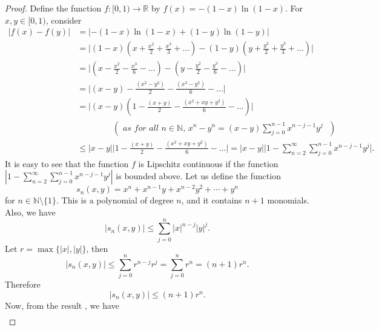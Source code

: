 \documentclass[pdflatex]{sn-jnl}%
\theoremstyle{thmstyleone}
\theoremstyle{thmstyletwo}%
\theoremstyle{thmstylethree}%
\begin{document}
\begin{proof}
    Define the function \( f : [0, 1) \to \mathbb{R} \) by $f(x) = -(1 - x)\ln(1 - x)$. For $x,y\in [0,1)$, consider
    \begin{equation}
    \begin{split}
        |f(x)-f(y)|&=|-(1 - x)\ln(1 - x)+(1 - y)\ln(1 - y)| \\
                   &=\Bigg|(1-x)\left(x+\frac{x^2}{2}+\frac{x^3}{3}+... \right)-(1-y)\left(y+\frac{y^2}{2}+\frac{y^3}{3}+... \right)\Bigg| \\
                   &=\Bigg| \left(x-\frac{x^2}{2}-\frac{x^3}{6}-...\right)-\left(y-\frac{y^2}{2}-\frac{y^3}{6}-...\right) \Bigg|\\
                   &=\Bigg| (x-y)-\frac{(x^2-y^2)}{2}-\frac{(x^3-y^3)}{6}-... \Bigg| \\
                   &=\Bigg| (x-y)\left( 1-\frac{(x+y)}{2}-\frac{(x^2+xy+y^2)}{6}-... \right) \Bigg| \\  & \ \ \ \ \ \ \ \ \ \ \ \ \ \ \ \ \ \ \ \left(\textit{ as for all $n\in \mathbb{N}$, $x^n-y^n=(x-y)\sum_{j=0}^{n-1}x^{n-j-1}y^j$ }\right) \\
                   &\leq |x-y|\Bigg| 1-\frac{(x+y)}{2}-\frac{(x^2+xy+y^2)}{6}-... \Bigg|=|x-y|\Bigg|1-\sum_{n=2}^{\infty}\sum_{j=0}^{n-1}x^{n-j-1}y^j \Bigg|.
    \end{split}
    \end{equation}
    It is easy to see that the function $f$ is Lipschitz continuous if the function $|1-\sum_{n=2}^{\infty}\sum_{j=0}^{n-1}x^{n-j-1}y^j |$ is bounded above. Let us define the function
\begin{equation}
s_n(x, y) = x^n + x^{n-1}y + x^{n-2}y^2 + \cdots + y^n
\end{equation}
for $n \in \mathbb{N} \setminus \{1\}$. This is a polynomial of degree \( n \), and it contains \( n+1 \) monomials. Also, we have
\begin{equation}
|s_n(x, y)| \leq \sum_{j=0}^{n} |x|^{n-j} |y|^j.
\end{equation}
Let \( r = \max\{ |x|, |y| \} \), then
\begin{equation}
|s_n(x, y)| \leq \sum_{j=0}^{n} r^{n-j} r^j = \sum_{j=0}^{n} r^n = (n+1)r^n.
\end{equation}
Therefore
\begin{equation}
|s_n(x, y)| \leq (n+1)r^n.
\end{equation}
Now, from the result \cite{mathtex}, we have 
\begin{equation}
\begin{split}

\end{split}
\end{equation}
\end{proof}
\end{document}
